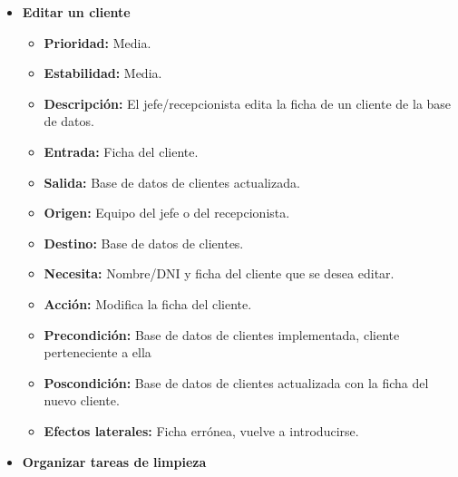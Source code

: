 \documentclass[spanish,a4paper,11pt, twoside]{report}	%
\begin{document}
\begin{itemize}
\begin{itemize}
		\end{itemize}%

		\item \textbf{Editar un cliente}  %

			\begin{itemize}
				\item \textbf{Prioridad: }Media.
				\item \textbf{Estabilidad: }Media.
				\item \textbf{Descripción: }El jefe/recepcionista edita la ficha de un cliente de la base de datos.
				\item \textbf{Entrada: } Ficha del cliente.
				\item \textbf{Salida: }Base de datos de clientes actualizada.
				\item \textbf{Origen: }Equipo del jefe o del recepcionista.
				\item \textbf{Destino: }Base de datos de clientes. 
				\item \textbf{Necesita: }Nombre/DNI y ficha del cliente que se desea editar. 
				\item \textbf{Acción: }Modifica la ficha del cliente.
				\item \textbf{Precondición: }Base de datos de clientes implementada, cliente perteneciente a ella
				\item \textbf{Poscondición: }Base de datos de clientes actualizada con la ficha del nuevo cliente. 
				\item \textbf{Efectos laterales: } Ficha errónea, vuelve a introducirse.

		\end{itemize}%





	\item \textbf{Organizar tareas de limpieza} %


\end{itemize}
\end{document}
